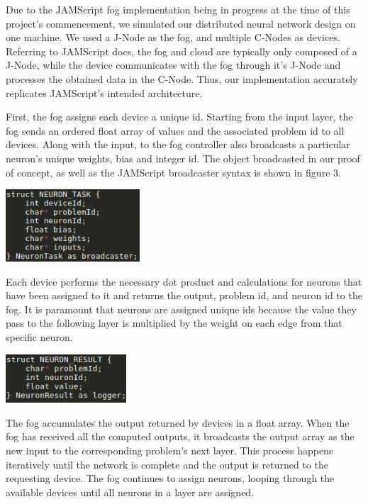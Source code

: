 \documentclass{article}
\newenvironment{Figure}
  {\par\medskip\noindent\minipage{\linewidth}}
  {\endminipage\par\medskip}
\begin{document}
\begin{multicols}{2} 
	Due to the JAMScript fog implementation being in progress at the time of this project’s commencement, we simulated our distributed neural network design on one machine. We used a J-Node as the fog, and multiple C-Nodes as devices. Referring to JAMScript docs, the fog and cloud are typically only composed of a J-Node, while the device communicates with the fog through it’s J-Node and processes the obtained data in the C-Node. Thus, our implementation accurately replicates JAMScript’s intended architecture. 
\par
First, the fog assigns each device a unique id. Starting from the input layer, the fog sends an ordered float array of values and the associated problem id to all devices. Along with the input, to the fog controller also broadcasts a particular neuron’s unique weights, bias and integer id. The object broadcasted in our proof of concept, as well as the JAMScript broadcaster syntax is shown in figure 3.
\begin{Figure}
 \centering
 \includegraphics[width=5cm]{neuron_task}
\end{Figure}
Each device performs the necessary dot product and calculations for neurons that have been assigned to it and returns the output, problem id, and neuron id to the fog. It is paramount that neurons are assigned unique ids because the value they pass to the following layer is multiplied by the weight on each edge from that specific neuron.
\begin{Figure}
 \centering
 \includegraphics[width=4.5cm]{neuron_result}
\end{Figure}
The fog accumulates the output returned by devices in a float array. When the fog has received all the computed outputs, it broadcasts the output array as the new input to the corresponding problem’s next layer. This process happens iteratively until the network is complete and the output is returned to the requesting device. The fog continues to assign neurons, looping through the available devices until all  neurons in a layer are assigned. 
\end{multicols}
\newpage
\end{document}
